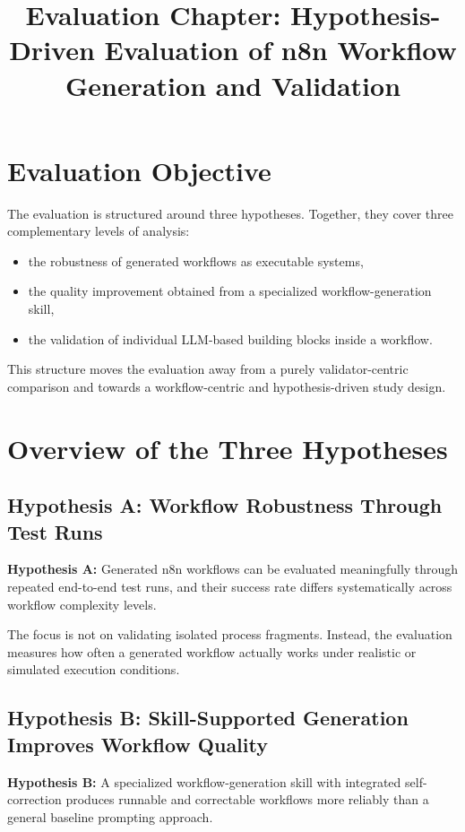 \documentclass[12pt,a4paper]{article}
\title{Evaluation Chapter: Hypothesis-Driven Evaluation of n8n Workflow Generation and Validation}
\author{}
\date{}
\begin{document}
\maketitle

\section{Evaluation Objective}

The evaluation is structured around three hypotheses. Together, they cover three complementary levels of analysis:

\begin{itemize}
  \item the robustness of generated workflows as executable systems,
  \item the quality improvement obtained from a specialized workflow-generation skill,
  \item the validation of individual LLM-based building blocks inside a workflow.
\end{itemize}

This structure moves the evaluation away from a purely validator-centric comparison and towards a workflow-centric and hypothesis-driven study design.

\section{Overview of the Three Hypotheses}

\subsection{Hypothesis A: Workflow Robustness Through Test Runs}

\textbf{Hypothesis A:} Generated n8n workflows can be evaluated meaningfully through repeated end-to-end test runs, and their success rate differs systematically across workflow complexity levels.

The focus is not on validating isolated process fragments. Instead, the evaluation measures how often a generated workflow actually works under realistic or simulated execution conditions.

\subsection{Hypothesis B: Skill-Supported Generation Improves Workflow Quality}

\textbf{Hypothesis B:} A specialized workflow-generation skill with integrated self-correction produces runnable and correctable workflows more reliably than a general baseline prompting approach.
\end{document}
